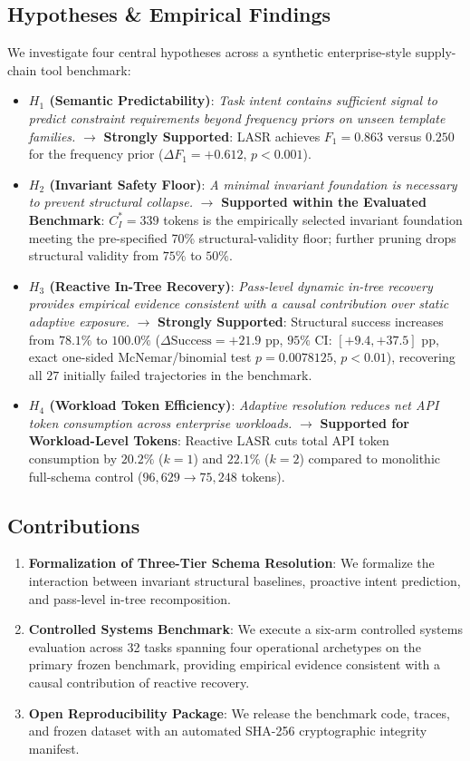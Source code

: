 \subsection{Hypotheses \& Empirical Findings}
We investigate four central hypotheses across a synthetic enterprise-style supply-chain tool benchmark:
\begin{itemize}
    \item \textbf{$H_1$ (Semantic Predictability)}: \textit{Task intent contains sufficient signal to predict constraint requirements beyond frequency priors on unseen template families.} $\rightarrow$ \textbf{Strongly Supported}: LASR achieves $F_1 = 0.863$ versus $0.250$ for the frequency prior ($\Delta F_1 = +0.612$, $p < 0.001$).
    \item \textbf{$H_2$ (Invariant Safety Floor)}: \textit{A minimal invariant foundation is necessary to prevent structural collapse.} $\rightarrow$ \textbf{Supported within the Evaluated Benchmark}: $C_I^* = 339$ tokens is the empirically selected invariant foundation meeting the pre-specified 70\% structural-validity floor; further pruning drops structural validity from $75\%$ to $50\%$.
    \item \textbf{$H_3$ (Reactive In-Tree Recovery)}: \textit{Pass-level dynamic in-tree recovery provides empirical evidence consistent with a causal contribution over static adaptive exposure.} $\rightarrow$ \textbf{Strongly Supported}: Structural success increases from $78.1\%$ to $100.0\%$ ($\Delta\text{Success} = +21.9\text{ pp}$, $95\%\text{ CI: } [+9.4, +37.5]\text{ pp}$, exact one-sided McNemar/binomial test $p = 0.0078125$, $p < 0.01$), recovering all $27$ initially failed trajectories in the benchmark.
    \item \textbf{$H_4$ (Workload Token Efficiency)}: \textit{Adaptive resolution reduces net API token consumption across enterprise workloads.} $\rightarrow$ \textbf{Supported for Workload-Level Tokens}: Reactive LASR cuts total API token consumption by $20.2\%$ ($k=1$) and $22.1\%$ ($k=2$) compared to monolithic full-schema control ($96,629 \rightarrow 75,248$ tokens).
\end{itemize}

\subsection{Contributions}
\begin{enumerate}
    \item \textbf{Formalization of Three-Tier Schema Resolution}: We formalize the interaction between invariant structural baselines, proactive intent prediction, and pass-level in-tree recomposition.
    \item \textbf{Controlled Systems Benchmark}: We execute a six-arm controlled systems evaluation across 32 tasks spanning four operational archetypes on the primary frozen benchmark, providing empirical evidence consistent with a causal contribution of reactive recovery.
    \item \textbf{Open Reproducibility Package}: We release the benchmark code, traces, and frozen dataset with an automated SHA-256 cryptographic integrity manifest.
\end{enumerate}
